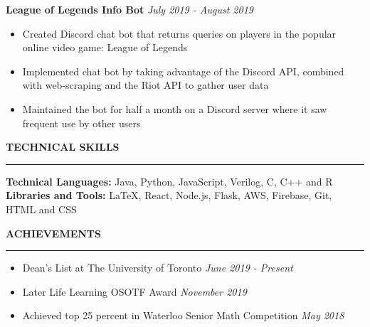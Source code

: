\documentclass[12pt,letterpaper]{article}
\begin{document}
        {\bf League of Legends Info Bot} \hfill {\em July 2019 - August 2019}\\
        \begin{itemize}\vspace{-1.8em}
            \item {Created Discord chat bot that returns queries on players in the popular online video game: League of Legends}
            \item {Implemented chat bot by taking advantage of the Discord API, combined with web-scraping and the Riot API to gather user data}
            \item {Maintained the bot for half a month on a Discord server where it saw frequent use by other users}\\
        \end{itemize}
    \endgroup
    
    \begingroup
        \MakeUppercase{\bf Technical Skills} \vspace{0.1cm}
        \hrule
        
        {\bf Technical Languages:} Java, Python, JavaScript, Verilog, C, C++ and R\\
        {\bf Libraries and Tools:} LaTeX, React, Node.js, Flask, AWS, Firebase, Git, HTML and CSS\\
    \endgroup
    
    \begingroup
        \MakeUppercase{\bf Achievements} \vspace{0.1cm}
        \hrule
        
        \begin{itemize}
            \item {Dean's List at The University of Toronto} \hfill {\em June 2019 - Present}
            \item {Later Life Learning OSOTF Award} \hfill {\em November 2019}
            \item{Achieved top 25 percent in Waterloo Senior Math Competition} \hfill {\em May 2018}
        \end{itemize}
    \endgroup
\end{document}
